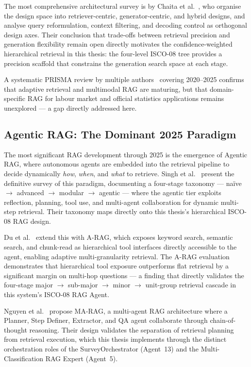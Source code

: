 The most comprehensive architectural survey is by Chaita et al.~\cite{chaita2025ragsurvey},
who organise the design space into retriever-centric, generator-centric, and
hybrid designs, and analyse query reformulation, context filtering, and
decoding control as orthogonal design axes.
Their conclusion that trade-offs between retrieval precision and generation
flexibility remain open directly motivates the confidence-weighted hierarchical
retrieval in this thesis: the four-level ISCO-08 tree provides a precision
scaffold that constrains the generation search space at each stage.

A systematic PRISMA review by multiple authors~\cite{multiauth2025ragreview}
covering 2020--2025 confirms that adaptive retrieval and multimodal RAG are
maturing, but that domain-specific RAG for labour market and official statistics
applications remains unexplored --- a gap directly addressed here.

\subsection{Agentic RAG: The Dominant 2025 Paradigm}

The most significant RAG development through 2025 is the emergence of Agentic
RAG, where autonomous agents are embedded into the retrieval pipeline to decide
dynamically \textit{how}, \textit{when}, and \textit{what} to retrieve.
Singh et al.~\cite{singh2025agentic} present the definitive survey of this
paradigm, documenting a four-stage taxonomy --- na\"{i}ve $\to$ advanced $\to$
modular $\to$ agentic --- where the agentic tier exploits reflection, planning,
tool use, and multi-agent collaboration for dynamic multi-step retrieval.
Their taxonomy maps directly onto this thesis's hierarchical ISCO-08 RAG design.

Du et al.~\cite{arag2026hierarchical} extend this with A-RAG, which exposes
keyword search, semantic search, and chunk-read as hierarchical tool interfaces
directly accessible to the agent, enabling adaptive multi-granularity retrieval.
The A-RAG evaluation demonstrates that hierarchical tool exposure outperforms
flat retrieval by a significant margin on multi-hop questions --- a finding that
directly validates the four-stage major $\to$ sub-major $\to$ minor $\to$
unit-group retrieval cascade in this system's ISCO-08 RAG Agent.

Nguyen et al.~\cite{nguyen2025marag} propose MA-RAG, a multi-agent RAG
architecture where a Planner, Step Definer, Extractor, and QA agent collaborate
through chain-of-thought reasoning.
Their design validates the separation of retrieval planning from retrieval
execution, which this thesis implements through the distinct orchestration roles
of the SurveyOrchestrator (Agent~13) and the Multi-Classification RAG Expert
(Agent~5).

